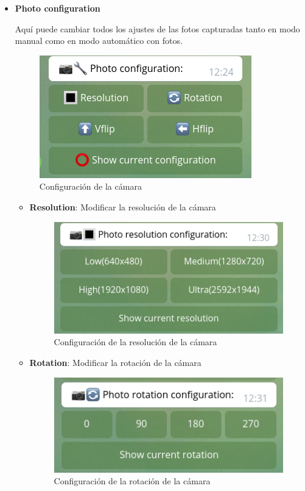 \vspace{-0.3cm}

\begin{itemize}

\item \textbf{Photo configuration}

Aquí puede cambiar todos los ajustes de las fotos capturadas tanto en modo manual como en modo automático con fotos.

\begin{figure}[H]
	\centering
	\includegraphics[scale=0.4]{images/70}
	\caption{Configuración de la cámara}
\end{figure}

\begin{itemize}

\item \textbf{Resolution}: Modificar la resolución de la cámara

\begin{figure}[H]
	\centering
	\includegraphics[scale=0.4]{images/71}
	\caption{Configuración de la resolución de la cámara}
\end{figure}

\item \textbf{Rotation}: Modificar la rotación de la cámara

\begin{figure}[H]
	\centering
	\includegraphics[scale=0.4]{images/72}
	\caption{Configuración de la rotación de la cámara}
\end{figure}


\end{itemize}
\end{itemize}
